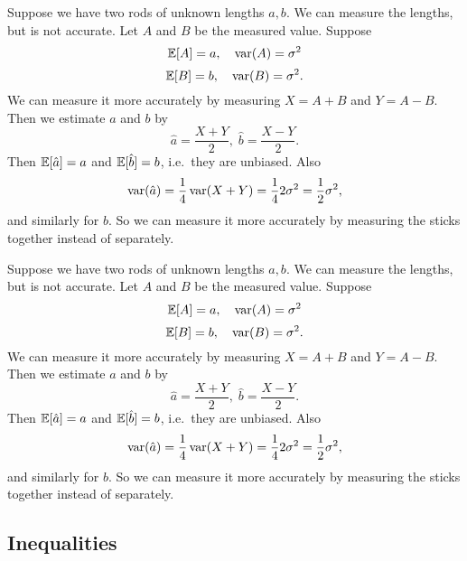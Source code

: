 \begin{note}
  \begin{field}
    \begin{eg}
      Suppose we have two rods of unknown lengths $a, b$. We can measure the lengths, but is not accurate. Let $A$ and $B$ be the measured value. Suppose
      \[
        \mathbb{E}[A] = a,\quad \operatorname{var}(A) = \sigma^2
      \]
      \[
        \mathbb{E}[B] = b, \quad \operatorname{var}(B) = \sigma^2.
      \]
      We can measure it more accurately by measuring $X = A + B$ and $Y = A - B$. Then we estimate $a$ and $b$ by
      \[
        \hat{a} = \frac{X + Y}{2},\; \hat{b} = \frac{X - Y}{2}.
      \]
      Then $\mathbb{E}[\hat{a}] = a$ and $\mathbb{E}[\hat{b}] = b$, i.e.\ they are unbiased. Also
      \[
        \operatorname{var} (\hat{a}) = \frac{1}{4}\operatorname{var}(X + Y) = \frac{1}{4}2\sigma^2 = \frac{1}{2}\sigma^2,
      \]
      and similarly for $b$. So we can measure it more accurately by measuring the sticks together instead of separately.
    \end{eg}
  \end{field}
  \begin{field}
    \begin{eg}
      Suppose we have two rods of unknown lengths $a, b$. We can measure the lengths, but is not accurate. Let $A$ and $B$ be the measured value. Suppose
      \[
        \mathbb{E}[A] = a,\quad \operatorname{var}(A) = \sigma^2
      \]
      \[
        \mathbb{E}[B] = b, \quad \operatorname{var}(B) = \sigma^2.
      \]
      We can measure it more accurately by measuring $X = A + B$ and $Y = A - B$. Then we estimate $a$ and $b$ by
      \[
        \hat{a} = \frac{X + Y}{2},\; \hat{b} = \frac{X - Y}{2}.
      \]
      Then $\mathbb{E}[\hat{a}] = a$ and $\mathbb{E}[\hat{b}] = b$, i.e.\ they are unbiased. Also
      \[
        \operatorname{var} (\hat{a}) = \frac{1}{4}\operatorname{var}(X + Y) = \frac{1}{4}2\sigma^2 = \frac{1}{2}\sigma^2,
      \]
      and similarly for $b$. So we can measure it more accurately by measuring the sticks together instead of separately.
    \end{eg}
  \end{field}
  \xplain{}%
\end{note}

\subsection{Inequalities}

